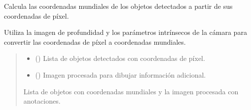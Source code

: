 \documentclass[a4paper,10pt,spanish]{sphinxmanual}
\begin{document}
\begin{fulllineitems}
\begin{description}
\end{description}

\begin{fulllineitems}
\label{\detokenize{squad_object_detection_action:squad_object_detection_action.TurtleBotObjectDetectionAction.calculate_world_coordinates}}
\pysigstartsignatures
{}
\pysigstopsignatures
\sphinxAtStartPar
Calcula las coordenadas mundiales de los objetos detectados a partir de sus coordenadas de píxel.

\sphinxAtStartPar
Utiliza la imagen de profundidad y los parámetros intrínsecos de la cámara para convertir
las coordenadas de píxel a coordenadas mundiales.
\begin{quote}\begin{description}
\begin{itemize}
\item {} 
\sphinxAtStartPar
{} () \textendash{} Lista de objetos detectados con coordenadas de píxel.

\item {} 
\sphinxAtStartPar
{} () \textendash{} Imagen procesada para dibujar información adicional.

\end{itemize}

\sphinxAtStartPar
Lista de objetos con coordenadas mundiales y la imagen procesada con anotaciones.

\sphinxAtStartPar
{}

\end{description}\end{quote}

\end{fulllineitems}


\end{fulllineitems}
\end{document}
